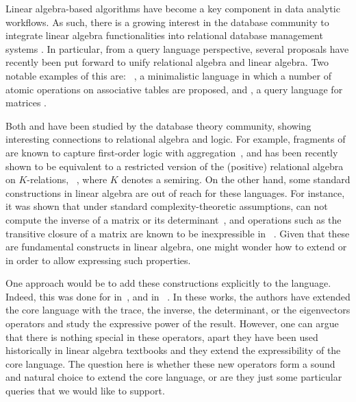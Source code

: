 
Linear algebra-based algorithms have become a key component in data analytic workflows. As such, there is a growing interest in the database community to integrate linear algebra functionalities into relational database management systems \cite{Jermaine/17/LAonRA,2019Boehm,LARA_Berlin_2016,JankovLYCZJG19,Khamis0NOS18}. In particular, from a query language perspective, several proposals have recently been put forward to unify relational algebra and linear algebra. Two notable examples of this are: \lara~\cite{HutchisonHS17}, a minimalistic language in which a number of atomic operations on 
associative tables are proposed, and \lang, a query language for 
matrices \cite{matlang-journal}.

Both \lara and \lang have been studied by the database theory community, showing interesting connections to relational algebra and logic. For example, fragments of \lara are known to capture first-order logic with aggregation~\cite{BarceloH0S20}, and \lang has been recently shown to be equivalent to a restricted version of the (positive) relational algebra on $K$-relations, \rak~\cite{brijder2019matrices}, where $K$ denotes a semiring. On the other hand, 
some standard constructions in linear algebra 
are out of reach for these languages. For instance, it was shown that under standard complexity-theoretic assumptions, \lara can not compute the inverse of a matrix or its determinant~\cite{BarceloH0S20}, and operations such as the transitive closure of a matrix are known to be inexpressible in \lang~\cite{matlang-journal}. Given that these are fundamental constructs in linear algebra, one might wonder how to extend \lara or \lang in order to allow expressing such properties.

One approach would be to add these constructions explicitly to the language. Indeed, this was done for \lang in~\cite{matlang-journal}, and \lara in ~\cite{BarceloH0S20}. In these works, the authors have extended the core language with the trace, the inverse, the determinant, or the eigenvectors operators and study the expressive power of the result. However, one can argue that there is nothing special in these operators, apart they have been used historically in linear algebra textbooks and they extend the expressibility of the core language. The question here is whether these new operators form a sound and natural choice to extend the core language, or are they just some particular queries that we would like to support. 

